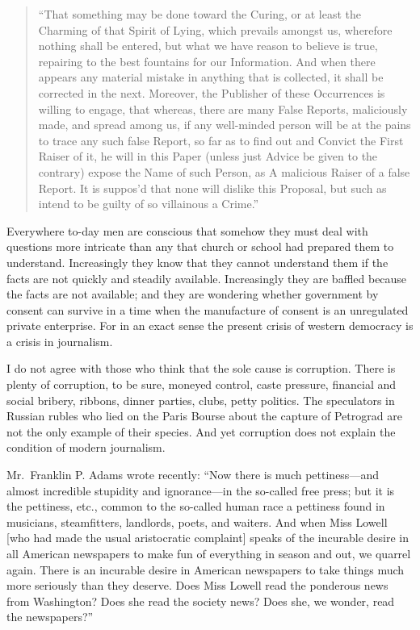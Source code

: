 \documentclass[openany,nobib,twoside,nohyper]{tufte-book}
\begin{document}
\begin{quote}
``That something may be done toward the Curing, or at least the Charming
of that Spirit of Lying, which prevails amongst us, wherefore nothing
shall be entered, but what we have reason to believe is true, repairing
to the best fountains for our Information. And when there appears any
material mistake in anything that is collected, it shall be corrected in
the next. Moreover, the Publisher of these Occurrences is willing to
engage, that whereas, there are many False Reports, maliciously made,
and spread among us, if any well-minded person will be at the pains to
trace any such false Report, so far as to find out and Convict the First
Raiser of it, he will in this Paper (unless just Advice be given to the
contrary) expose the Name of such Person, as A malicious Raiser of a
false Report. It is suppos'd that none will dislike this Proposal, but
such as intend to be guilty of so villainous a Crime.''
\end{quote}

Everywhere to-day men are conscious that somehow they must deal with
questions more intricate than any that church or school had prepared
them to understand. Increasingly they know that they cannot understand
them if the facts are not quickly and steadily available. Increasingly
they are baffled because the facts are not available; and they are
wondering whether government by consent can survive in a time when the
manufacture of consent is an unregulated private enterprise. For in an
exact sense the present crisis of western democracy is a crisis in
journalism.

I do not agree with those who think that the sole cause is corruption.
There is plenty of corruption, to be sure, moneyed control, caste
pressure, financial and social bribery, ribbons, dinner parties, clubs,
petty politics. The speculators in Russian rubles who lied on the Paris
Bourse about the capture of Petrograd are not the only example of their
species. And yet corruption does not explain the condition of modern
journalism.

\enlargethispage{\baselineskip}

Mr.~Franklin P. Adams wrote recently: ``Now there is much
pettiness---and almost incredible stupidity and ignorance---in the
so-called free press; but it is the pettiness, etc., common to the
so-called human race a pettiness found in musicians, steamfitters,
landlords, poets, and waiters. And when Miss Lowell {[}who had made the
usual aristocratic complaint{]} speaks of the incurable desire in all
American newspapers to make fun of everything in season and out, we
quarrel again. There is an incurable desire in American newspapers to
take things much more seriously than they deserve. Does Miss Lowell read
the ponderous news from Washington? Does she read the society news? Does
she, we wonder, read the newspapers?''
\end{document}
